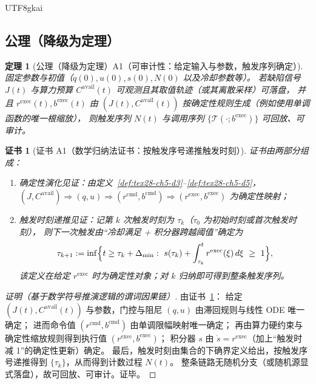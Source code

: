 \documentclass[12pt]{article}
\newtheorem{theorem}{定理}[section]
\newtheorem{Certificate}{证书}[section]
\begin{document}
\begin{CJK*}{UTF8}{gkai}
\subsection{公理（降级为定理）}
\label{subsec:tex28-ch5-axioms}

\begin{theorem}[公理（降级为定理）A1（可审计性：给定输入与参数，触发序列确定）]
\label{thm:tex28-ch5-a1}
固定参数与初值（$q(0),u(0),s(0),N(0)$ 以及冷却参数等）。
若缺陷信号 $J(t)$ 与算力预算 $C^{\mathrm{avail}}(t)$ 可观测且其取值轨迹（或其离散采样）可落盘，
并且 $r^{\mathrm{exec}}(t),b^{\mathrm{exec}}(t)$ 由 $(J(t),C^{\mathrm{avail}}(t))$ 按确定性规则生成（例如使用单调函数的唯一根缩放），
则触发序列 $N(t)$ 与调用序列 $\{\mathcal{T}(\cdot;b^{\mathrm{exec}})\}$ 可回放、可审计。
\end{theorem}

\begin{Certificate}[证书 A1（数学归纳法证书：按触发序号递推触发时刻）]
\label{cert:tex28-ch5-a1}
证书由两部分组成：
\begin{enumerate}
  \item 确定性演化见证：由定义~\ref{def:tex28-ch5-d3}--\ref{def:tex28-ch5-d5}，
  $(J,C^{\mathrm{avail}})\Rightarrow(q,u)\Rightarrow(r^{\mathrm{cmd}},b^{\mathrm{cmd}})\Rightarrow(r^{\mathrm{exec}},
    b^{\mathrm{exec}})$ 为确定性映射；
  \item 触发时刻递推见证：记第 $k$ 次触发时刻为 $\tau_k$（$\tau_0$ 为初始时刻或首次触发时刻），
  则下一次触发由“冷却满足 + 积分器跨越阈值”确定为
  \[
    \tau_{k+1}:=\inf\Bigl\{t\ge \tau_k+\Delta_{\min}:\ s(\tau_k)+\int_{\tau_k}^{t} r^{\mathrm{exec}}(\xi)\,d\xi\ \ge\
      1\Bigr\},
  \]
  该定义在给定 $r^{\mathrm{exec}}$ 时为确定性对象；对 $k$ 归纳即可得到整条触发序列。
\end{enumerate}
\end{Certificate}

\begin{proof}[证明（基于数学符号推演逻辑的谓词因果链）]
由证书~\ref{cert:tex28-ch5-a1}：
给定 $(J(t),C^{\mathrm{avail}}(t))$ 与参数，门控与阻尼 $(q,u)$ 由滞回规则与线性 ODE 唯一确定；
进而命令值 $(r^{\mathrm{cmd}},b^{\mathrm{cmd}})$ 由单调限幅映射唯一确定；
再由算力硬约束与确定性缩放规则得到执行值 $(r^{\mathrm{exec}},b^{\mathrm{exec}})$；
积分器 $s$ 由 $\dot s=r^{\mathrm{exec}}$（加上“触发时减 1”的确定性更新）确定。
最后，触发时刻由集合的下确界定义给出，按触发序号递推得到 $\{\tau_k\}$，从而得到计数过程 $N(t)$。
整条链路无随机分支（或随机源显式落盘），故可回放、可审计。证毕。
\end{proof}


\end{CJK*}
\end{document}
